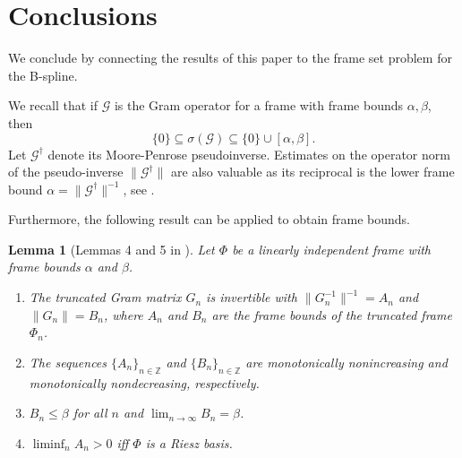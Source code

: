 \documentclass{article}
\newtheorem{lemma}[theorem]{Lemma}
\begin{document}









\section{Conclusions}\label{sec:conclusion}
We conclude by connecting the results of this paper to the frame set problem for the B-spline.

We recall that if $\mathscr{G}$ is the Gram operator for a frame with frame bounds $\alpha, \beta$, then
\[\{0\}\subseteq \sigma(\mathscr{G})\subseteq\{0\}\cup [\alpha, \beta]. \]
Let  $\mathscr{G}^\dagger$ denote its Moore-Penrose pseudoinverse.
Estimates on the operator norm of the pseudo-inverse $\|\mathscr{G}^\dagger\|$ are also valuable as its reciprocal is the lower frame bound $\alpha = \|\mathscr{G}^\dagger\|^{-1}$, see \cite{adcock2019frames}. 


Furthermore, the following result can be applied to obtain frame bounds.

\begin{lemma}[Lemmas 4 and 5 in \cite{adcock2019frames}]\label{lem:adcock}
Let  $\Phi$ be a linearly independent frame with frame bounds $\alpha$ and $\beta$.
 \begin{enumerate}
 \item The truncated Gram matrix $G_n$ is invertible with $\|G^{-1}_n\|^{-1}=A_n$ and  $\|G_n\|=B_n$, where $A_n$ and $B_n$ are the frame bounds of the truncated frame $\Phi_n$.
 \item The sequences $\{A_n\}_{n\in \mathbb{Z}}$ and $\{B_n\}_{n\in \mathbb{Z}}$ are monotonically nonincreasing and monotonically nondecreasing, respectively.
 \item $B_n\leq \beta$ for all $n$ and $\lim_{n\to\infty}B_n=\beta$.
 \item $\liminf_{n}A_n>0$ iff $\Phi$ is a Riesz basis.
\end{enumerate}


\end{lemma}
\end{document}
